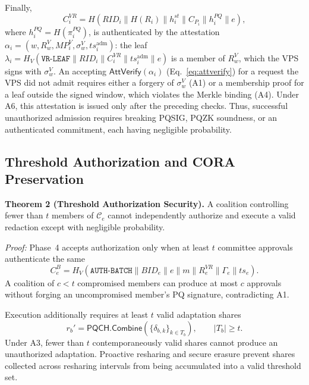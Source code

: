\documentclass[lettersize,journal]{IEEEtran}
\begin{document}
Finally,
\begin{equation}
C_i^{VR}
=
H(RID_i\parallel H(R_i)\parallel h_i^{st}
\parallel C_{P_i}\parallel h_i^{PQ}\parallel e),
\end{equation}
where $h_i^{PQ}=H(\pi_i^{PQ})$, is authenticated by
\textcolor{e2}{the attestation
$\alpha_i=(w,R_w^{V},MP_i^{V},\sigma_w^{V},ts_i^{\mathrm{adm}})$: the leaf
$\lambda_i=H_V(\texttt{VR-LEAF}\parallel RID_i\parallel C_i^{VR}\parallel
ts_i^{\mathrm{adm}}\parallel e)$ is a member of $R_w^{V}$, which the VPS
signs with $\sigma_w^{V}$. An accepting $\mathsf{AttVerify}(\alpha_i)$
(Eq.~\eqref{eq:attverify}) for a request the VPS did not admit requires
either a forgery of $\sigma_w^{V}$ (A1) or a membership proof for a leaf
outside the signed window, which violates the Merkle binding (A4).}
Under A6, this attestation is issued only after the preceding checks.
Thus, successful unauthorized admission requires breaking PQSIG,
PQZK soundness, or an authenticated commitment, each having negligible
probability.

\subsection{Threshold Authorization and CORA Preservation}

\textbf{Theorem 2 (Threshold Authorization Security).}
A coalition controlling fewer than $t$ members of
$\mathcal{C}_e$ cannot independently authorize and execute a valid
redaction except with negligible probability.

\emph{Proof:}
Phase~4 accepts authorization only when at least $t$ committee
approvals authenticate the same
\begin{equation}
C_e^B=
H_V(\texttt{AUTH-BATCH}\parallel BID_e\parallel e\parallel m
\parallel R_e^{VR}\parallel\Gamma_e\parallel ts_e).
\label{eq:sec_auth_batch}
\end{equation}
A coalition of $c<t$ compromised members can produce at most $c$
approvals without forging an uncompromised member's PQ signature,
contradicting A1.

Execution additionally requires at least $t$ valid adaptation shares
\begin{equation}
r_b'=
\mathsf{PQCH.Combine}
(\{\delta_{b,k}\}_{k\in T_b}),
\qquad |T_b|\geq t.
\end{equation}
Under A3, fewer than $t$ contemporaneously valid shares cannot produce
an unauthorized adaptation. Proactive resharing and secure erasure
prevent shares collected across resharing intervals from being
accumulated into a valid threshold set.
\end{document}
